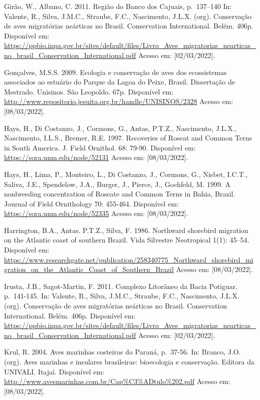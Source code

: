 \documentclass[
  oneside]{scrbook}
\begin{document}
Girão, W., Albano, C. 2011. Região do Banco dos Cajuais, p.~137--140 In: Valente, R., Silva, J.M.C., Straube, F.C., Nascimento, J.L.X. (org). Conservação de aves migratórias neárticas no Brasil. Conservation International. Belém. 406p. Disponível em: \url{https://ppbio.inpa.gov.br/sites/default/files/Livro_Aves_migratorias_nearticas_no_brasil_Conservation_International.pdf} Acesso em: {[}02/03/2022{]}.

Gonçalves, M.S.S. 2009. Ecologia e conservação de aves dos ecossistemas associados ao estuário do Parque da Lagoa do Peixe, Brasil. Dissertação de Mestrado. Unisinos. São Leopoldo. 67p. Disponível em: \url{http://www.repositorio.jesuita.org.br/handle/UNISINOS/2328} Acesso em: {[}08/03/2022{]}.

Hays, H., Di Costanzo, J., Cormons, G., Antas, P.T.Z., Nascimento, J.L.X., Nascimento, I.L.S., Bremer, R.E. 1997. Recoveries of Roseat and Common Terns in South America. J. Field Ornithol. 68: 79-90. Disponível em: \url{https://sora.unm.edu/node/52131} Acesso em: {[}08/03/2022{]}.

Hays, H., Lima, P., Monteiro, L., Di Costanzo, J., Cormons, G., Nisbet, I.C.T., Saliva, J.E., Spendelow, J.A., Burger, J., Pierce, J., Gochfeld, M. 1999. A nonbreeding concentration of Roseate and Common Terns in Bahia, Brazil. Journal of Field Ornithology 70: 455-464. Disponível em: \url{https://sora.unm.edu/node/52335} Acesso em: {[}08/03/2022{]}.

Harrington, B.A., Antas. P.T.Z., Silva, F. 1986. Northward shorebird migration on the Atlantic coast of southern Brazil. Vida Silvestre Neotropical 1(1): 45--54. Disponível em: \url{https://www.researchgate.net/publication/258340775_Northward_shorebird_migration_on_the_Atlantic_Coast_of_Southern_Brazil} Acesso em: {[}08/03/2022{]}.

Irusta, J.B., Sagot-Martin, F. 2011. Complexo Litorâneo da Bacia Potiguar, p.~141-145. In: Valente, R., Silva, J.M.C., Straube, F.C., Nascimento, J.L.X. (org). Conservação de aves migratórias neárticas no Brasil. Conservation International. Belém. 406p. Disponível em: \url{https://ppbio.inpa.gov.br/sites/default/files/Livro_Aves_migratorias_nearticas_no_brasil_Conservation_International.pdf} Acesso em: {[}02/03/2022{]}.

Krul, R. 2004. Aves marinhas costeiras do Paraná, p.~37-56. In: Branco, J.O. (org). Aves marinhas e insulares brasileiras: bioecologia e conservação. Editora da UNIVALI. Itajaí. Disponível em: \url{http://www.avesmarinhas.com.br/Cap\%C3\%ADtulo\%202.pdf} Acesso em: {[}08/03/2022{]}.
\end{document}
